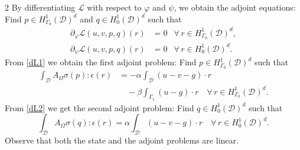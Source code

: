 \documentclass[a4paper, oneside]{article}
\begin{document}
\begin{multicols}{2}
By differentiating $\mathcal{L}$ with respect to $\varphi$ and $\psi$,
we obtain the adjoint equations:
Find $p \in  H^1_{\Gamma_0}(\mathcal{D})^d$ and $ q\in H^1_0(\mathcal{D})^d$ such that
\begin{align}
\label{dL1}	\partial_{\varphi}\mathcal{L}(u,v,p,q)(r)&=0 & \forall \, r \in  H^1_{\Gamma_0}(\mathcal{D})^d,\\
\label{dL2}	\partial_{\psi}\mathcal{L}(u,v,p,q)(r)&=0 & \forall \, r \in  H^1_0(\mathcal{D})^d.
\end{align}
From \eqref{dL1} we obtain the first adjoint problem:
Find $p \in  H^1_{\Gamma_0}(\mathcal{D})^d$ such that
\begin{align*} \label{eq:f-adj}
\int_{\mathcal{D}} A_{\Omega}\sigma(p):\epsilon(r) & = -\alpha \int_{\mathcal{D}} (u-v-g) \cdot r \\
&\quad -\beta \int_{\Gamma_1} (u - g) \cdot r \quad
\forall \, r \in  H^1_{\Gamma_0}(\mathcal{D})^d.
\end{align*}
From \eqref{dL2} we get the second adjoint problem:
Find $q \in  H^1_{0}(\mathcal{D})^d$ such that
\begin{equation*} \label{eq:g-adj}
	\int_{\mathcal{D}} A_{\Omega}\sigma(q):\epsilon(r) =
	\alpha \int_{\mathcal{D}} (u-v-g) \cdot r \quad \forall \, r \in  H^1_0(\mathcal{D})^d.
\end{equation*}
Observe that both the state and the adjoint problems are linear.



\end{multicols}
\end{document}

